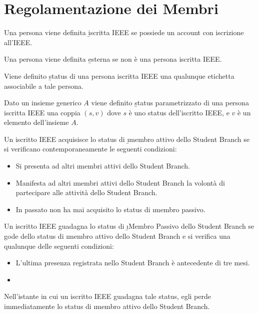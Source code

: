 \section{Regolamentazione dei Membri}

\begin{defn}
	Una persona viene definita \b{iscritta IEEE} se possiede un account con iscrizione all'IEEE.
\end{defn}

\begin{defn}[Esterno]
	Una persona viene definita \b{esterna} se non è una persona iscritta IEEE.
\end{defn}

\begin{defn}[Status]
	Viene definito \b{status} di una persona iscritta IEEE una qualunque etichetta associabile a tale persona.
\end{defn}

\begin{defn}
Dato un insieme generico $A$ viene definito \b{status parametrizzato} di una persona iscritta IEEE una coppia $(s,v)$ dove $s$ è uno status dell'iscritto IEEE, e $v$ è un elemento dell'insieme $A$.
\end{defn}

\begin{regl}
	Un iscritto IEEE acquisisce lo status di \b{\i{membro attivo}} dello Student Branch se si verificano contemporaneamente le seguenti condizioni:
	\begin{itemize}
		\item Si presenta ad altri \i{membri attivi} dello Student Branch.
		\item Manifesta ad altri \i{membri attivi} dello Student Branch la volontà di partecipare alle attività dello Student Branch.
		\item In passato non ha mai acquisito lo status di \i{membro passivo}.
	\end{itemize}
\end{regl}

\begin{regl}
	Un iscritto IEEE guadagna lo status di \b{\i{Membro Passivo}} dello Student Branch se gode dello status di \i{membro attivo} dello Student Branch e si verifica una qualunque delle seguenti condizioni:
	\begin{itemize}
		\item L'ultima presenza registrata nello Student Branch è antecedente di tre mesi.
		\item 
	\end{itemize}
	Nell'istante in cui un iscritto IEEE guadagna tale status, egli perde immediatamente lo status di \i{membro attivo} dello Student Branch.
\end{regl}